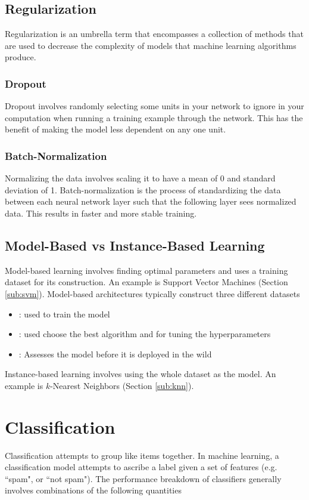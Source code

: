 \subsection{Regularization}
Regularization is an umbrella term that encompasses a collection of methods that are used to decrease the complexity of models that machine learning algorithms produce.

\subsubsection{Dropout}
Dropout involves randomly selecting some units in your network to ignore in your computation when running a training example through the network. This has the benefit of making the model less dependent on any one unit.

\subsubsection{Batch-Normalization}
Normalizing the data involves scaling it to have a mean of 0 and standard deviation of 1. Batch-normalization is the process of standardizing the data between each neural network layer such that the following layer sees normalized data. This results in faster and more stable training. 

\subsection{Model-Based vs Instance-Based Learning}
Model-based learning involves finding optimal parameters and uses a training dataset for its construction. An example is Support Vector Machines (Section \ref{sub:svm}). Model-based architectures typically construct three different datasets
\begin{itemize}
    \item {}: used to train the model
    \item {}: used choose the best algorithm and  for tuning the hyperparameters 
    \item {}: Assesses the model before it is deployed in the wild
\end{itemize}

Instance-based learning involves using the whole dataset as the model. An example is $k$-Nearest Neighbors (Section \ref{sub:knn}).


\section{Classification}
Classification attempts to group like items together. In machine learning, a classification model attempts to ascribe a label given a set of features (e.g. ``spam", or ``not spam"). The performance breakdown of classifiers generally involves combinations of the following quantities

